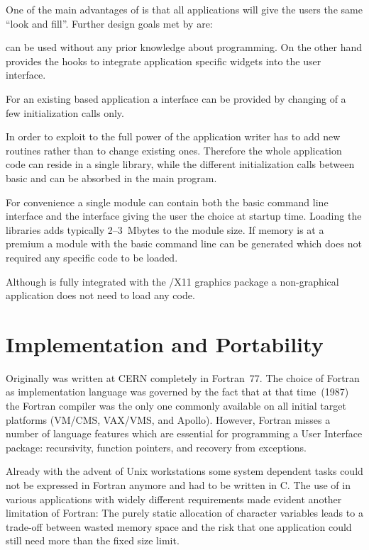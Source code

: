 One of the main advantages of \KUIPMotif{} is that all applications
will give the users the same ``look and fill''.
Further design goals met by \KUIPMotif{} are:
\begin{UL}
\item
\KUIPMotif{} can be used without any prior knowledge about \Motif{}
programming.
On the other hand \KUIPMotif{} provides the hooks to integrate
application specific \Motif{} widgets into the user interface.
\item
For an existing \KUIP{} based application a \Motif{} interface can be
provided by changing of a few initialization calls only.
\item
In order to exploit to the full power of \KUIPMotif{} the application
writer has to add new routines rather than to change existing ones.
Therefore the whole application code can reside in a single library,
while the different initialization calls between basic \KUIP{} and
\KUIPMotif{} can be absorbed in the main program.
\item
For convenience a single module can contain both the basic \KUIP{} command
line interface and the \KUIPMotif{} interface giving the user the
choice at startup time.
Loading the \Motif{} libraries adds typically 2--3~Mbytes to the module size.
If memory is at a premium a module with the basic \KUIP{} command line
can be generated which does not required any \Motif{} specific code to
be loaded.
\item
Although \KUIPMotif{} is fully integrated with the \HIGZ{}/X11
graphics package a non-graphical application does not need to load any
\HIGZ{} code.
\end{UL}

%
%
\section{Implementation and Portability}

Originally \KUIP{} was written at CERN completely in Fortran~77.
The choice of Fortran as implementation language was governed by the
fact that at that time~(1987) the Fortran compiler was the only one commonly
available on all initial target platforms (VM/CMS, VAX/VMS, and Apollo).
However, Fortran misses a number of language features which are
essential for programming a User Interface package:
recursivity, function pointers, and recovery from exceptions.

Already with the advent of Unix workstations
some system dependent tasks could not be expressed in Fortran
anymore and had to be written in C.
The use of \KUIP{} in various applications with widely different
requirements made evident another limitation of Fortran:
The purely static allocation of character variables leads to a
trade-off between wasted memory space and the risk that one
application could still need more than the fixed size limit.

